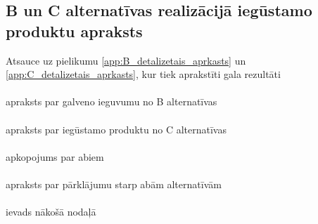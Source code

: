 \subsection{B un C alternatīvas realizācijā iegūstamo produktu apraksts}
Atsauce uz pielikumu \ref{app:B_detalizetais_aprkasts} un \ref{app:C_detalizetais_aprkasts}, kur tiek aprakstīti gala rezultāti
\paragraph{}
apraksts par galveno ieguvumu no B alternatīvas
\paragraph{}
apraksts par iegūstamo produktu no C alternatīvas
\paragraph{}
apkopojums par abiem
\paragraph{}
apraksts par pārklājumu starp abām alternatīvām
\paragraph{}
ievads nākošā nodaļā